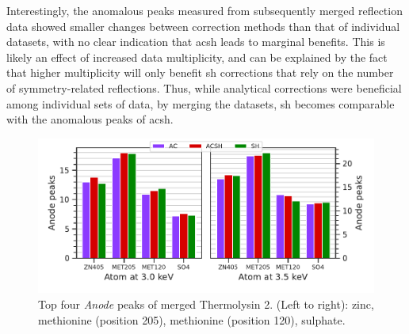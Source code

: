 Interestingly, the anomalous peaks measured from subsequently merged reflection data showed smaller changes between correction methods than that of individual datasets, with no clear indication that \ac{acsh} leads to marginal benefits. This is likely an effect of increased data multiplicity, and can be explained by the fact that higher multiplicity will only benefit \ac{sh} corrections that rely on the number of symmetry-related reflections. Thus, while analytical corrections were beneficial among individual sets of data, by merging the datasets, \ac{sh} becomes comparable with the anomalous peaks of \ac{acsh}.



\begin{figure}[h]
    \centering
    \includegraphics[width = 0.9 \textwidth]{plots/exp1/tlys_2_P6122/peaks/merged_peaks.pdf}
    \caption{Top four \textit{Anode} peaks of merged Thermolysin 2. (Left to right): zinc, methionine (position 205), methionine (position 120), sulphate.}
    \label{fig:tlys_2_merged_peaks}
\end{figure}


